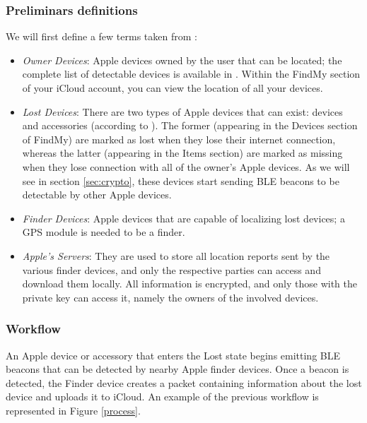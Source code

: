 \documentclass[english]{article}
\begin{document}
\subsubsection{Preliminars definitions}
We will first define a few terms taken from \cite{whocanfind}:
\begin{itemize}
  \item \textit{Owner Devices}: Apple devices owned by the user that can be located; the complete list of detectable devices is available in \cite{Apple}. Within the FindMy section of your iCloud account, you can view the location of all your devices.
  \item \textit{Lost Devices}: There are two types of Apple devices that can exist: devices and accessories (according to \cite{whocanfind}). The former (appearing in the Devices section of FindMy) are marked as lost when they lose their internet connection, whereas the latter (appearing in the Items section) are marked as missing when they lose connection with all of the owner's Apple devices. As we will see in section \ref{sec:crypto}, these devices start sending BLE beacons to be detectable by other Apple devices.
  \item \textit{Finder Devices}: Apple devices that are capable of localizing lost devices; a GPS module is needed to be a finder.
  \item \textit{Apple’s Servers}: They are used to store all location reports sent by the various finder devices, and only the respective parties can access and download them locally. All information is encrypted, and only those with the private key can access it, namely the owners of the involved devices.
\end{itemize}
\subsubsection{Workflow}
An Apple device or accessory that enters the Lost state begins emitting BLE beacons that can be detected by nearby Apple finder devices. Once a beacon is detected, the Finder device creates a packet containing information about the lost device and uploads it to iCloud. An example of the previous workflow is represented in Figure \ref{process}.
\end{document}
